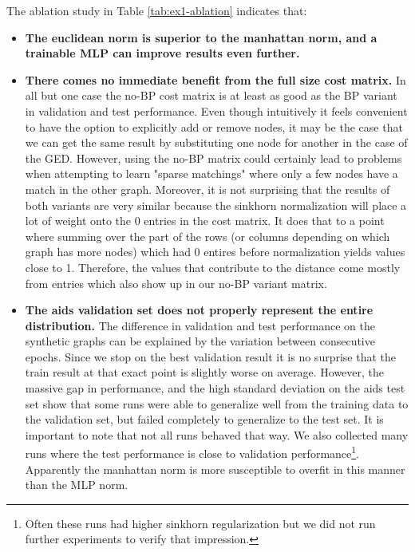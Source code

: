 The ablation study in Table \ref{tab:ex1-ablation} indicates that:
\begin{itemize}
    \itemsep0em
    \item \textbf{The euclidean norm is superior to the manhattan norm, and a trainable MLP can improve results even further.}
    \item \textbf{There comes no immediate benefit from the full size cost matrix.} In all but one case the no-BP cost matrix is at least as good as the BP variant in validation and test performance. Even though intuitively it feels convenient to have the option to explicitly add or remove nodes, it may be the case that we can get the same result by substituting one node for another in the case of the GED. However, using the no-BP matrix could certainly lead to problems when attempting to learn "sparse matchings" where only a few nodes have a match in the other graph. Moreover, it is not surprising that the results of both variants are very similar because the sinkhorn normalization will place a lot of weight onto the 0 entries in the cost matrix. It does that to a point where summing over the part of the rows (or columns depending on which graph has more nodes) which had 0 entires before normalization yields values close to 1. Therefore, the values that contribute to the distance come mostly from entries which also show up in our no-BP variant matrix.
    \item \textbf{The aids validation set does not properly represent the entire distribution.} The difference in validation and test performance on the synthetic graphs can be explained by the variation between consecutive epochs. Since we stop on the best validation result it is no surprise that the train result at that exact point is slightly worse on average. However, the massive gap in performance, and the high standard deviation on the aids test set show that some runs were able to generalize well from the training data to the validation set, but failed completely to generalize to the test set. It is important to note that not all runs behaved that way. We also collected many runs where the test performance is close to validation performance\footnote{Often these runs had higher sinkhorn regularization but we did not run further experiments to verify that impression.}. Apparently the manhattan norm is more susceptible to overfit in this manner than the MLP norm.
\end{itemize}


